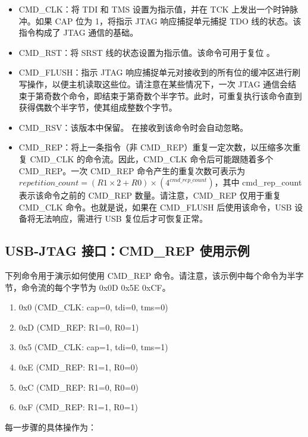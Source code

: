 \documentclass[main\_\_CN.tex]{subfiles}
\begin{document}
\begin{itemize}
\item CMD\_CLK：将 TDI 和 TMS 设置为指示值，并在 TCK 上发出一个时钟脉冲。如果 CAP 位为 1，将指示 JTAG 响应捕捉单元捕捉 TDO 线的状态。该指令构成了 JTAG 通信的基础。
\item CMD\_RST：将 SRST 线的状态设置为指示值。该命令可用于复位 \chipname{}。
\item CMD\_FLUSH：指示 JTAG 响应捕捉单元对接收到的所有位的缓冲区进行刷写操作，以便主机读取这些位。请注意在某些情况下，一次 JTAG 通信会结束于第奇数个命令，即结束于第奇数个半字节。此时，可重复执行该命令直到获得偶数个半字节，使其组成整数个字节。
\item CMD\_RSV：该版本中保留。\chipname{} 在接收到该命令时会自动忽略。
\item CMD\_REP：将上一条指令（非 CMD\_REP）重复一定次数，以压缩多次重复 CMD\_CLK 的命令流。因此，CMD\_CLK 命令后可能跟随着多个 CMD\_REP。一次 CMD\_REP 命令产生的重复次数可表示为 \begin{math}repetition\_count = (R1 \times 2 + R0) \times (4^{cmd\_rep\_count})\end{math}，其中 cmd\_rep\_count 表示该命令之前的 CMD\_REP 数量。请注意，CMD\_REP 仅用于重复 CMD\_CLK 命令。也就是说，如果在 CMD\_FLUSH 后使用该命令，USB 设备将无法响应，需进行 USB 复位后才可恢复正常。
\end{itemize}

\subsection{USB-JTAG 接口：CMD\_REP 使用示例}

下列命令用于演示如何使用 CMD\_REP 命令。请注意，该示例中每个命令为半字节，命令流的每个字节为 0x0D 0x5E 0xCF。

\begin{enumerate}
\item 0x0 (CMD\_CLK: cap=0, tdi=0, tms=0)
\item 0xD (CMD\_REP: R1=0, R0=1)
\item 0x5 (CMD\_CLK: cap=1, tdi=0, tms=1)
\item 0xE (CMD\_REP: R1=1, R0=0)
\item 0xC (CMD\_REP: R1=0, R0=0)
\item 0xF (CMD\_REP: R1=1, R0=1)
\end{enumerate}

每一步骤的具体操作为：
\end{document}
